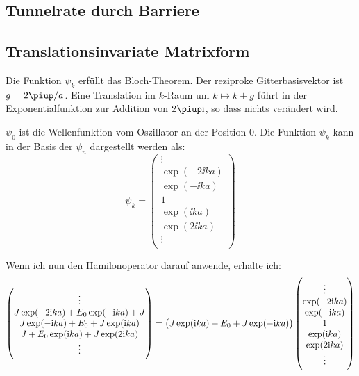 \subsection{Tunnelrate durch Barriere}

\fehlt

\subsection{Translationsinvariate Matrixform}

Die Funktion $\psi_k$ erfüllt das Bloch-Theorem. Der reziproke
Gitterbasisvektor ist $g = 2\piup/a$. Eine Translation im $k$-Raum um $k
\mapsto k + g$ führt in der Exponentialfunktion zur Addition von $2\piup \ii$,
so dass nichts verändert wird.

$\psi_0$ ist die Wellenfunktion vom Oszillator an der Position 0. Die Funktion $\psi_k$ kann in der Basis der $\psi_n$ dargestellt werden als:
\[
	\psi_k =
	\begin{pmatrix}
		\vdots \\
		\exp(-2 \ii k a) \\
		\exp(- \ii k a) \\
		1 \\
		\exp(\ii k a) \\
		\exp(2 \ii k a) \\
		\vdots \\
	\end{pmatrix}
\]

Wenn ich nun den Hamilonoperator darauf anwende, erhalte ich:
\[
	\begin{pmatrix}
		\vdots \\
		J \exp(-2\ii ka) + E_0 \exp(-\ii ka) + J \\
		J \exp(-\ii ka) + E_0 + J \exp(\ii ka) \\
		J + E_0 \exp(\ii ka) + J \exp(2\ii ka) \\
		\vdots \\
	\end{pmatrix}
	=
	\del{J \exp(\ii ka) + E_0 + J \exp(-\ii ka)}
	\begin{pmatrix}
		\vdots \\
		\exp(-2 \ii k a) \\
		\exp(- \ii k a) \\
		1 \\
		\exp(\ii k a) \\
		\exp(2 \ii k a) \\
		\vdots \\
	\end{pmatrix}
\]

